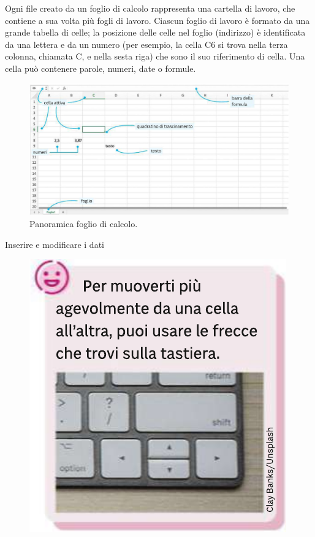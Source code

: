 \documentclass[12pt,a4paper,oneside]{book}
\makeatletter
\renewcommand{\subsection}{\@startsection {subsection}{2}{\z@}
{-3ex \@plus -0.1ex \@minus -.4ex}
{0.5ex \@plus.2ex }
{\color[rgb]{0.141,0.596,0.749}\normalfont\sffamily\bfseries}}
\theoremstyle{esercizio}
\makeatother
\begin{document}
    Ogni file creato da un foglio di calcolo rappresenta una cartella di lavoro, che contiene a sua volta più fogli di lavoro. Ciascun foglio di lavoro è formato da una grande tabella di celle; la posizione delle celle nel foglio (indirizzo) è identificata da una lettera e da un numero (per esempio, la cella C6 si trova nella terza colonna, chiamata C, e nella sesta riga) che sono il suo riferimento di cella.
    Una cella può contenere parole, numeri, date o formule.
    \begin{figure}[h!]
        \centering
        \includegraphics[width=\linewidth]{path_to_image/calc.png} 
        \caption{Panoramica foglio di calcolo.}
        \label{fig:librecalc}
    \end{figure} 

\subsection{Inserire e modificare i dati}
\begin{figure}[h!]
    \centering
    \includegraphics[scale=0.3]{path_to_image/tasti.png} 
    \label{fig:tasti}
\end{figure} 
\end{document}
